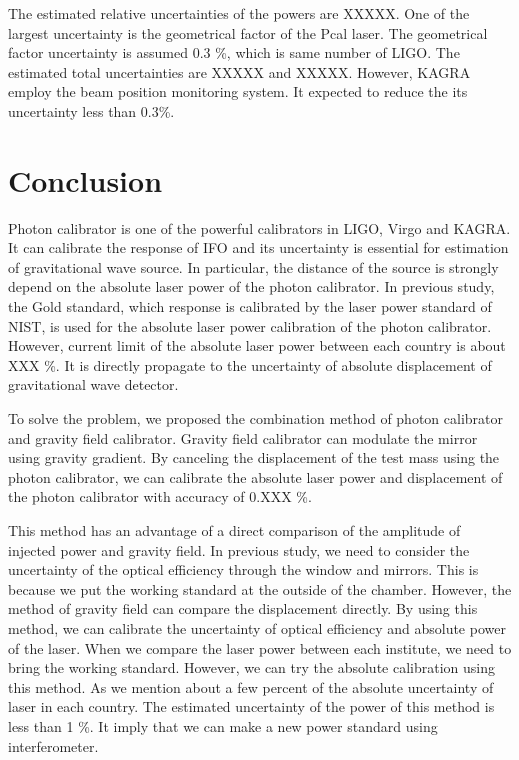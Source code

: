 \documentclass[]{spie}  %
\begin{document}
The estimated relative uncertainties of the powers are XXXXX. One of the largest uncertainty is the geometrical factor of the Pcal laser. The geometrical factor uncertainty is assumed 0.3 \%, which is same number of LIGO. The estimated total uncertainties are XXXXX and XXXXX. However, KAGRA employ the beam position monitoring system. It expected to reduce the its uncertainty less than 0.3\%. 


\section{Conclusion}
Photon calibrator is one of the powerful calibrators in LIGO, Virgo and KAGRA. It can calibrate the response of IFO and its uncertainty is essential for estimation of gravitational wave source. In particular, the distance of the source is strongly depend on the absolute laser power of the photon calibrator. In previous study, the Gold standard, which response is calibrated by the laser power standard of NIST, is used for the absolute laser power calibration of the photon calibrator. However, current limit of the absolute laser power between each country is about XXX \%. It is directly propagate to the uncertainty of absolute displacement of gravitational wave detector.

To solve the problem, we proposed the combination method of photon calibrator and gravity field calibrator. Gravity field calibrator can modulate the mirror using gravity gradient. By canceling the displacement of the test mass using the photon calibrator, we can calibrate the absolute laser power and displacement of the photon calibrator with accuracy of 0.XXX \%.

This method has an advantage of a direct comparison of the amplitude of injected power and gravity field. In previous study, we need to consider the uncertainty of the optical efficiency through the window and mirrors. This is because we put the working standard at the outside of the chamber. However, the method of gravity field can compare the displacement directly. By using this method, we can calibrate the uncertainty of optical efficiency and absolute power of the laser. When we compare the laser power between each institute, we need to bring the working standard. However, we can try the absolute calibration using this method. As we mention about a few percent of the absolute uncertainty of laser in each country. The estimated uncertainty of the power of this method is less than 1 \%. It imply that we can make a new power standard using interferometer.
\acknowledgments     %
 
\end{document}
